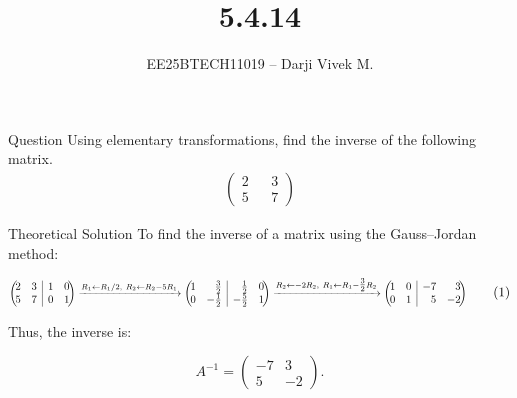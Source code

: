 \documentclass{beamer}
\title{5.4.14}
\author{EE25BTECH11019 -- Darji Vivek M.}
\date{}
\makeatletter
\newcommand{\myvec}[1]{\begin{pmatrix}#1\end{pmatrix}}
\newcommand{\augvec}[3]{%
  \left(\!\begin{array}{@{}*{#1}{r}|*{#2}{r}@{}}#3\end{array}\!\right)
}
\makeatother
\begin{document}
\begin{frame}
\begin{titlepage}

\end{titlepage}
\end{frame}

\begin{frame}{Question}
Using elementary transformations, find the inverse of the following matrix. 
\begin{align*}
    \myvec{2&&3\\5&&7}
\end{align*}
\end{frame}

\begin{frame}{Theoretical Solution}
To find the inverse of a matrix using the Gauss–Jordan method:

\begin{equation}
\resizebox{1\textwidth}{!}{$
\augvec{2}{2}{2 & 3 & 1 & 0\\ 5 & 7 & 0 & 1}
\xrightarrow{R_1 \gets R_1/2,\ R_2 \gets R_2 - 5 R_1}
\augvec{2}{2}{1 & \tfrac{3}{2} & \tfrac{1}{2} & 0\\ 0 & -\tfrac{1}{2} & -\tfrac{5}{2} & 1}
\xrightarrow{R_2 \gets -2 R_2,\ R_1 \gets R_1 - \tfrac{3}{2} R_2}
\augvec{2}{2}{1 & 0 & -7 & 3\\ 0 & 1 & 5 & -2}
$}
\tag{1}
\end{equation}

Thus, the inverse is:

\begin{equation}
A^{-1} =
\myvec{-7 & 3\\ 5 & -2}.
\tag{2}
\end{equation}
\end{frame}
\end{document}

